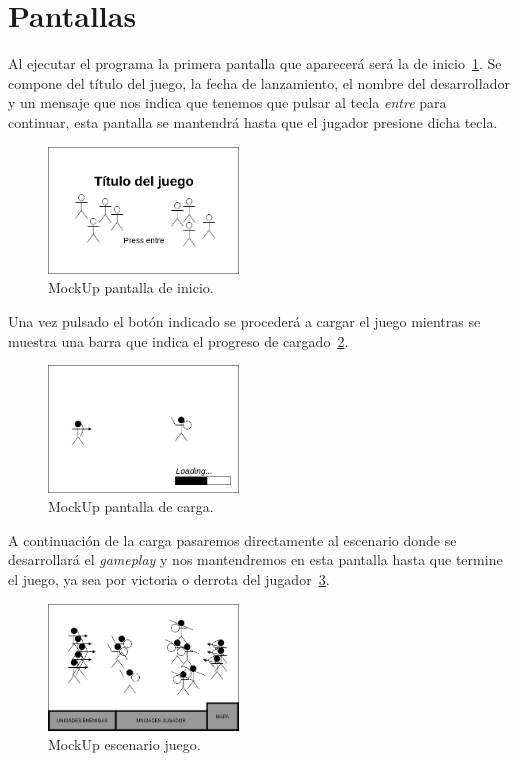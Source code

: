 \section{Pantallas}
Al ejecutar el programa la primera pantalla que aparecerá será la de 
inicio~\ref{mockup_ini}. Se compone del título del juego, la fecha de lanzamiento,
el nombre del desarrollador y un mensaje que nos indica que tenemos que pulsar al tecla
\textit{entre} para continuar, esta pantalla se mantendrá hasta que el jugador presione
dicha tecla.

\begin{figure}[ht]
\centering
\includegraphics[width=0.45\textwidth]{imagenes/Pantalla_ini.png}
\caption{MockUp pantalla de inicio.}
\label{mockup_ini}
\end{figure}

Una vez pulsado el botón indicado se procederá a cargar el juego mientras se muestra
una barra que indica el progreso de cargado~\ref{mockup_carga}.

\begin{figure}[ht]
\centering
\includegraphics[width=0.45\textwidth]{imagenes/Pantalla_carga.png}
\caption{MockUp pantalla de carga.}
\label{mockup_carga}
\end{figure}

A continuación de la carga pasaremos directamente al escenario donde se desarrollará el
\textit{gameplay} y nos mantendremos en esta pantalla hasta que termine el juego, ya sea
por victoria o derrota del jugador~\ref{mockup_juego}.

\begin{figure}[ht]
\centering
\includegraphics[width=0.45\textwidth]{imagenes/Pantalla_gameplay.png}
\caption{MockUp escenario juego.}
\label{mockup_juego}
\end{figure}

